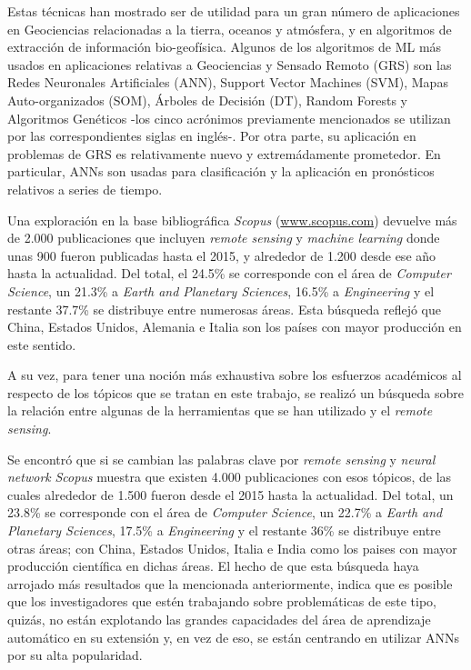     \par Estas técnicas han mostrado ser de utilidad para un gran número de
      aplicaciones en Geociencias relacionadas a la tierra, oceanos y atmósfera,
      y en algoritmos de extracción de información bio-geofísica.
      Algunos de los algoritmos de ML más usados en aplicaciones relativas a
      Geociencias y Sensado Remoto (GRS) son las Redes Neuronales Artificiales (ANN),
      Support Vector Machines (SVM), Mapas Auto-organizados (SOM), Árboles de Decisión (DT),
      Random Forests y Algoritmos Genéticos -los cinco acrónimos previamente mencionados
      se utilizan por las correspondientes siglas en inglés-.
      Por otra parte, su aplicación en problemas de GRS es
      relativamente nuevo y extremádamente prometedor. En particular, ANNs son
      usadas para clasificación y la aplicación en pronósticos
      relativos a series de tiempo.

    \par Una exploración en la base bibliográfica \textit{Scopus} (\url{www.scopus.com})
      devuelve más de 2.000 publicaciones que incluyen \textit{remote sensing} y
      \textit{machine learning} donde unas 900 fueron publicadas hasta el 2015, y
      alrededor de 1.200 desde ese año hasta la actualidad. Del total, el 24.5\% se
      corresponde con el área de \textit{Computer Science}, un 21.3\% a
      \textit{Earth and Planetary Sciences}, 16.5\% a \textit{Engineering} y el
      restante 37.7\% se distribuye entre numerosas áreas. Esta búsqueda reflejó
      que China, Estados Unidos, Alemania e Italia son los países con mayor
      producción en este sentido.

    \par A su vez, para tener una noción más exhaustiva sobre los esfuerzos académicos
      al respecto de los tópicos que se tratan en este trabajo, se realizó un búsqueda
      sobre la relación entre algunas de la herramientas que se han utilizado y
      el \textit{remote sensing}.

    \par Se encontró que si se cambian las palabras clave por
      \textit{remote sensing} y \textit{neural network} \textit{Scopus} muestra
      que existen 4.000 publicaciones con esos tópicos, de las cuales alrededor de
      1.500 fueron desde el 2015 hasta la actualidad. Del total, un 23.8\% se
      corresponde con el área de \textit{Computer Science}, un 22.7\% a
      \textit{Earth and Planetary Sciences}, 17.5\% a \textit{Engineering} y el
      restante 36\% se distribuye entre otras áreas; con China,
      Estados Unidos, Italia e India como los paises con mayor producción
      científica en dichas áreas.
      El hecho de que esta búsqueda haya arrojado más resultados que la mencionada
      anteriormente, indica que es posible que los investigadores que estén trabajando
      sobre problemáticas de este tipo, quizás, no están explotando las grandes
      capacidades del área de aprendizaje automático en su extensión y, en vez de
      eso, se están centrando en utilizar ANNs por su alta popularidad.

